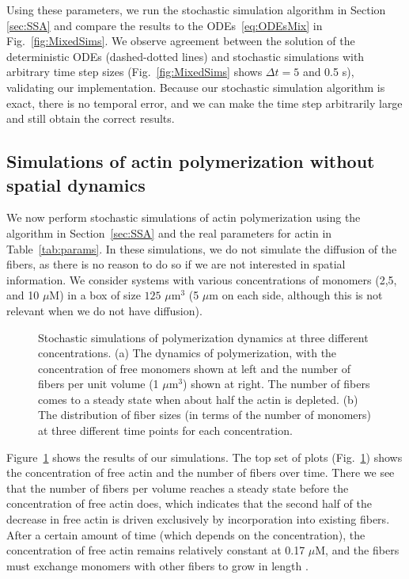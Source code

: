 \documentclass[11pt]{article}
\begin{document}
Using these parameters, we run the stochastic simulation algorithm in Section \ref{sec:SSA} and compare the results to the ODEs\ \eqref{eq:ODEsMix} in Fig.\ \ref{fig:MixedSims}. We observe agreement between the solution of the deterministic ODEs (dashed-dotted lines) and stochastic simulations with arbitrary time step sizes (Fig.\ \ref{fig:MixedSims} shows $\Delta t=5$ and 0.5 s), validating our implementation. Because our stochastic simulation algorithm is exact, there is no temporal error, and we can make the time step arbitrarily large and still obtain the correct results.

\subsection{Simulations of actin polymerization without spatial dynamics}
We now perform stochastic simulations of actin polymerization using the algorithm in Section\ \ref{sec:SSA} and the real parameters for actin in Table\ \ref{tab:params}. In these simulations, we do not simulate the diffusion of the fibers, as there is no reason to do so if we are not interested in spatial information. We consider systems with various concentrations of monomers (2,5, and 10 $\mu$M) in a box of size $125$ $\mu$m$^3$ (5 $\mu$m on each side, although this is not relevant when we do not have diffusion). 

\begin{figure}
\centering
{}
\caption{\label{fig:ActinPolyMix}Stochastic simulations of polymerization dynamics at three different concentrations. (a) The dynamics of polymerization, with the concentration of free monomers shown at left and the number of fibers per unit volume (1 $\mu$m$^3$) shown at right. The number of fibers comes to a steady state when about half the actin is depleted. (b) The distribution of fiber sizes (in terms of the number of monomers) at three different time points for each concentration.}
\end{figure}

Figure\ \ref{fig:ActinPolyMix} shows the results of our simulations. The top set of plots (Fig.\ \ref{fig:ActinPolyMix}) shows the concentration of free actin and the number of fibers over time. There we see that the number of fibers per volume reaches a steady state before the concentration of free actin does, which indicates that the second half of the decrease in free actin is driven exclusively by incorporation into existing fibers. After a certain amount of time (which depends on the concentration), the concentration of free actin remains relatively constant at 0.17 $\mu$M, and the fibers must exchange monomers with other fibers to grow in length \cite{hu2007theoretical}. 
\end{document}
